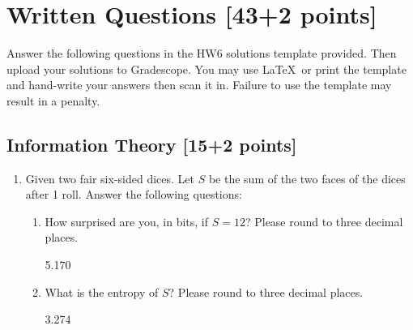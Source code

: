 \documentclass[11pt]{article}
\numberwithin{equation}{section} %
\numberwithin{figure}{section} %
\numberwithin{table}{section} %
\newcommand{\points}[1]{{\bf [#1 points]}}
\begin{document}
\clearpage
\section{Written Questions \points{43+2}}
\label{sec:warmup}
Answer the following questions in the HW6 solutions template provided.  Then upload your solutions to Gradescope. You may use \LaTeX\ or print the template and hand-write your answers then scan it in. Failure to use the template may result in a penalty.
\subsection{Information Theory [15+2 points]}
\begin{enumerate}
    \item[1] [2 points] Given two fair six-sided dices. Let $S$ be the sum of the two faces of the dices after 1 roll. Answer the following questions:
    \begin{enumerate}
        \item How surprised are you, in bits, if $S=12$? Please round to three decimal places.\\
        \begin{tcolorbox}[fit,height=1cm, width=0.5\linewidth, blank, borderline={1pt}{-2pt},nobeforeafter]
        \begin{center}\huge5.170\end{center}
        \end{tcolorbox}
        \item What is the entropy of $S$? Please round to three decimal places.\\
        \begin{tcolorbox}[fit,height=1cm, width=0.5\linewidth, blank, borderline={1pt}{-2pt},nobeforeafter]
        \begin{center}\huge3.274\end{center}
        \end{tcolorbox}
    \end{enumerate}
    

\end{enumerate}
\end{document}
